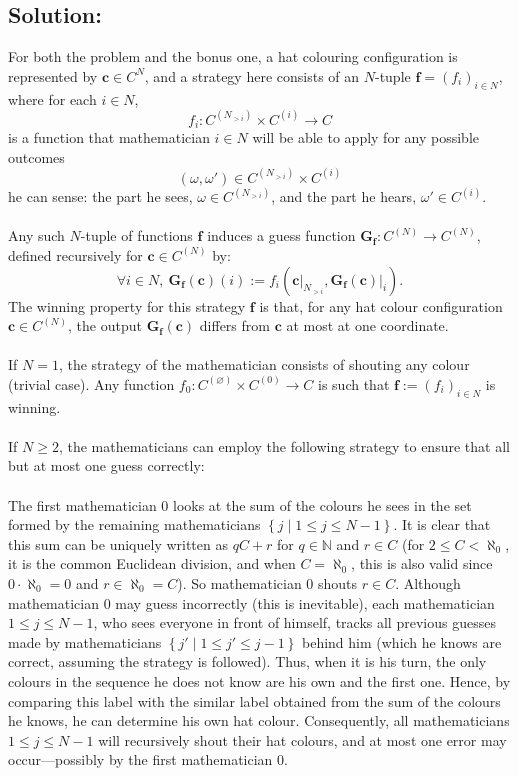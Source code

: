 \documentclass[11pt, a4paper, oneside]{article}
\newcommand{\solution}[1][]{\subsection*{#1}\hfill \par}
\theoremstyle{remark}
\theoremstyle{lemma}
\begin{document}
\solution[Solution:]
For both the problem and the bonus one, a hat colouring configuration is represented by \( \mathbf{c} \in C^{N} \), and a strategy here consists of an \( N \)-tuple \(\mathbf{f}=\left( f_i \right)_{i \in N} \), where for each \( i \in N \),
\[
f_i: C^{\left( N_{>i} \right)} \times C^{\left( i \right)} \rightarrow C
\]
is a function that mathematician \( i \in N \) will be able to apply for any possible outcomes
\[
\left( \omega, \omega' \right) \in C^{\left( N_{>i} \right)} \times C^{\left( i \right)}
\]
he can sense: the part he sees, \( \omega \in C^{\left( N_{>i} \right)} \), and the part he hears, \( \omega' \in C^{\left( i \right)} \).
\\\\
Any such \( N \)-tuple of functions \(\mathbf{f}\) induces a guess function \( \mathbf{G}_{\mathbf{f}}: C^{\left( N \right)} \rightarrow C^{\left( N \right)} \), defined recursively for \( \mathbf{c} \in C^{\left( N \right)} \) by:
\[
\forall i \in N,\ \mathbf{G}_{\mathbf{f}}(\mathbf{c})(i) := f_i\left( \mathbf{c}\big|_{N_{>i}}, \mathbf{G}_{\mathbf{f}}(\mathbf{c})\big|_{i} \right).
\]
The winning property for this strategy \( \mathbf{f} \) is that, for any hat colour configuration \( \mathbf{c} \in C^{\left( N \right)} \), the output \( \mathbf{G}_{\mathbf{f}}(\mathbf{c}) \) differs from \( \mathbf{c} \) at most at one coordinate.
\\\\
If \( N = 1 \), the strategy of the mathematician consists of shouting any colour (trivial case). Any function \( f_0: C^{\left( \varnothing \right)} \times C^{\left( 0 \right)} \rightarrow C \) is such that \( \mathbf{f} := (f_i)_{i \in N} \) is winning.
\\\\
If \( N \geq 2 \), the mathematicians can employ the following strategy to ensure that all but at most one guess correctly:
\\\\
The first mathematician \(0\) looks at the sum of the colours he sees in the set formed by the remaining mathematicians \(\left\{ j \mid 1 \leq j \leq N - 1 \right\}\). It is clear that this sum can be uniquely written as \(qC + r\) for \(q \in \mathbb{N}\) and \(r \in C\) (for \(2 \leq C < \aleph_0\), it is the common Euclidean division, and when \(C = \aleph_0\), this is also valid since \(0 \cdot \aleph_0 = 0\) and \(r \in \aleph_0 = C\)). So mathematician \(0\) shouts \(r \in C\). Although mathematician \(0\) may guess incorrectly (this is inevitable), each mathematician \(1 \leq j \leq N - 1\), who sees everyone in front of himself, tracks all previous guesses made by mathematicians \(\left\{ j' \mid 1 \leq j' \leq j - 1 \right\}\) behind him (which he knows are correct, assuming the strategy is followed). Thus, when it is his turn, the only colours in the sequence he does not know are his own and the first one. Hence, by comparing this label with the similar label obtained from the sum of the colours he knows, he can determine his own hat colour. Consequently, all mathematicians \(1 \leq j \leq N - 1\) will recursively shout their hat colours, and at most one error may occur—possibly by the first mathematician \(0\).
\end{document}
